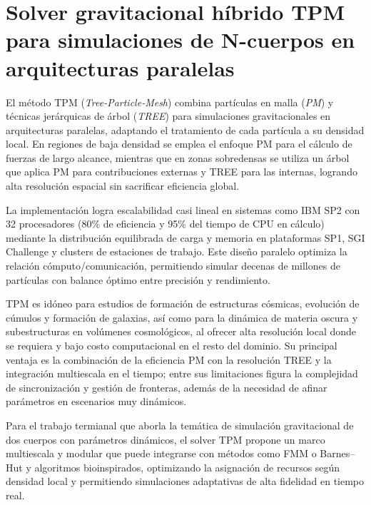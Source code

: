 \section[Solver gravitacional híbrido TPM]{Solver gravitacional híbrido TPM para simulaciones de N-cuerpos en arquitecturas paralelas}%
\label{sec:state_of_the_art_07}
El método TPM (\textit{Tree-Particle-Mesh}) combina partículas en malla (\textit{PM}) y técnicas jerárquicas de árbol (\textit{TREE}) para simulaciones gravitacionales en arquitecturas paralelas, adaptando el tratamiento de cada partícula a su densidad local. En regiones de baja densidad se emplea el enfoque PM para el cálculo de fuerzas de largo alcance, mientras que en zonas sobredensas se utiliza un árbol que aplica PM para contribuciones externas y TREE para las internas, logrando alta resolución espacial sin sacrificar eficiencia global.

La implementación logra escalabilidad casi lineal en sistemas como IBM SP2 con 32 procesadores (80\% de eficiencia y 95\% del tiempo de CPU en cálculo) mediante la distribución equilibrada de carga y memoria en plataformas SP1, SGI Challenge y clusters de estaciones de trabajo. Este diseño paralelo optimiza la relación cómputo/comunicación, permitiendo simular decenas de millones de partículas con balance óptimo entre precisión y rendimiento.

TPM es idóneo para estudios de formación de estructuras cósmicas, evolución de cúmulos y formación de galaxias, así como para la dinámica de materia oscura y subestructuras en volúmenes cosmológicos, al ofrecer alta resolución local donde se requiera y bajo costo computacional en el resto del dominio. Su principal ventaja es la combinación de la eficiencia PM con la resolución TREE y la integración multiescala en el tiempo; entre sus limitaciones figura la complejidad de sincronización y gestión de fronteras, además de la necesidad de afinar parámetros en escenarios muy dinámicos.

Para el trabajo termianal que aborla la temática de simulación gravitacional de dos cuerpos con parámetros dinámicos, el solver TPM propone un marco multiescala y modular que puede integrarse con métodos como FMM o Barnes–Hut y algoritmos bioinspirados, optimizando la asignación de recursos según densidad local y permitiendo simulaciones adaptativas de alta fidelidad en tiempo real.

